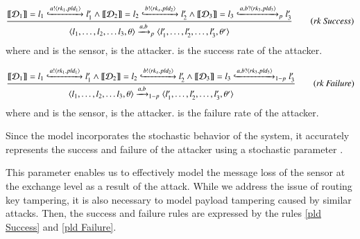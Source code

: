 
\begin{boxD}
	      \begin{equation}\label{rkSuccess} \frac{ \sset{\mathcal{D}_{1}}= l_{1}\gparrow{a!\gl{rk_{1},pld_{1}}}l'_{1} \wedge \sset{\mathcal{D}_{2}}= l_{2}\gparrow{b!\gl{rk_{x},pld_{2}} }l'_{2} \wedge
         \sset{\mathcal{D}_{3}}= l_{3}\gparrow{a, b?\gl{rk_{3},pld_{3}}}_{p}l'_{3}       
       } {  \langle l_{1},\ldots,l_{2},\ldots l_{3},\theta\rangle  \xrightarrow{a,b}_{p}\langle l'_{1},\ldots,l'_{2},\ldots,l'_{3},\theta'\rangle } \tag{\emph{rk Success}} \end{equation} where  and  is the sensor,  is the attacker.  is the success rate of the attacker.

	      \begin{equation}\label{rkFailure}\frac{ \sset{\mathcal{D}_{1}}= l_{1}\gparrow{a!\gl{rk_{1},pld_{1}}}l'_{1} \wedge \sset{\mathcal{D}_{2}}=  l_{2}\gparrow{b!\gl{rk_{x},pld_{2}} }l'_{2} \wedge
         \sset{\mathcal{D}_{3}}= l_{3}\gparrow{a, b?\gl{rk_{3},pld_{3}}}_{1-p}l'_{3}       
       } {  \langle l_{1},\ldots,l_{2},\ldots l_{3},\theta\rangle  \xrightarrow{a,b}_{1-p}\langle l'_{1},\ldots,l'_{2},\ldots,l'_{3},\theta'\rangle } \tag{\emph{rk Failure}} \end{equation} where  and  is the sensor,  is the attacker.  is the failure rate of the attacker.
\end{boxD}


Since the model incorporates the stochastic behavior of the system, it accurately represents the success and failure of the attacker using a stochastic parameter . 


This parameter enables us to effectively model the message loss of the sensor at the exchange level as a result of the attack. While we address the issue of routing key tampering, it is also necessary to model payload tampering caused by similar attacks. Then, the success and failure rules are expressed by the rules \ref{pld Success} and \ref{pld Failure}.


